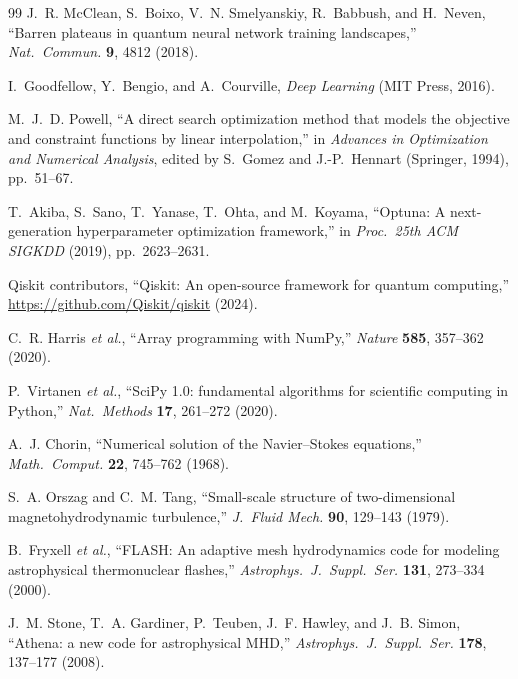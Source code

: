 \documentclass[12pt, a4paper, oneside]{report}
\begin{document}
\begin{thebibliography}{99}
J.~R. McClean, S.~Boixo, V.~N. Smelyanskiy, R.~Babbush, and H.~Neven, ``Barren plateaus in quantum neural network training landscapes,'' \textit{Nat.\ Commun.} \textbf{9}, 4812 (2018).

I.~Goodfellow, Y.~Bengio, and A.~Courville, \textit{Deep Learning} (MIT Press, 2016).

M.~J.~D. Powell, ``A direct search optimization method that models the objective and constraint functions by linear interpolation,'' in \textit{Advances in Optimization and Numerical Analysis}, edited by S.~Gomez and J.-P.~Hennart (Springer, 1994), pp.~51--67.

T.~Akiba, S.~Sano, T.~Yanase, T.~Ohta, and M.~Koyama, ``Optuna: A next-generation hyperparameter optimization framework,'' in \textit{Proc.\ 25th ACM SIGKDD} (2019), pp.~2623--2631.

Qiskit contributors, ``Qiskit: An open-source framework for quantum computing,'' \url{https://github.com/Qiskit/qiskit} (2024).

C.~R. Harris \textit{et al.}, ``Array programming with NumPy,'' \textit{Nature} \textbf{585}, 357--362 (2020).

P.~Virtanen \textit{et al.}, ``SciPy 1.0: fundamental algorithms for scientific computing in Python,'' \textit{Nat.\ Methods} \textbf{17}, 261--272 (2020).

A.~J. Chorin, ``Numerical solution of the Navier--Stokes equations,'' \textit{Math.\ Comput.} \textbf{22}, 745--762 (1968).

S.~A. Orszag and C.~M. Tang, ``Small-scale structure of two-dimensional magnetohydrodynamic turbulence,'' \textit{J.\ Fluid Mech.} \textbf{90}, 129--143 (1979).


B.~Fryxell \textit{et al.}, ``FLASH: An adaptive mesh hydrodynamics code for modeling astrophysical thermonuclear flashes,'' \textit{Astrophys.\ J.\ Suppl.\ Ser.} \textbf{131}, 273--334 (2000).

J.~M. Stone, T.~A. Gardiner, P.~Teuben, J.~F. Hawley, and J.~B. Simon, ``Athena: a new code for astrophysical MHD,'' \textit{Astrophys.\ J.\ Suppl.\ Ser.} \textbf{178}, 137--177 (2008).


\end{thebibliography}
\end{document}
